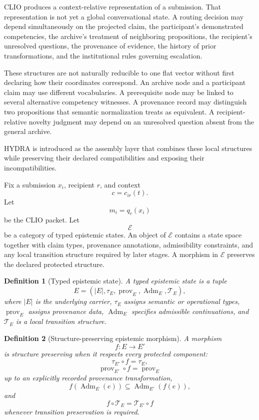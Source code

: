 \documentclass[11pt]{article}
\newtheorem{definition}{Definition}[section]
\theoremstyle{definition}
\DeclareMathOperator{\Adm}{Adm}
\begin{document}
CLIO produces a context-relative representation of a submission. That representation is not yet a global conversational state. A routing decision may depend simultaneously on the projected claim, the participant's demonstrated competencies, the archive's treatment of neighboring propositions, the recipient's unresolved questions, the provenance of evidence, the history of prior transformations, and the institutional rules governing escalation.

These structures are not naturally reducible to one flat vector without first declaring how their coordinates correspond. An archive node and a participant claim may use different vocabularies. A prerequisite node may be linked to several alternative competency witnesses. A provenance record may distinguish two propositions that semantic normalization treats as equivalent. A recipient-relative novelty judgment may depend on an unresolved question absent from the general archive.

HYDRA is introduced as the assembly layer that combines these local structures while preserving their declared compatibilities and exposing their incompatibilities.

Fix a submission \(x_i\), recipient \(r\), and context
\[
c=c_{ir}(t).
\]
Let
\[
m_i=q_c(x_i)
\]
be the CLIO packet. Let
\[
\mathscr E
\]
be a category of typed epistemic states. An object of \(\mathscr E\) contains a state space together with claim types, provenance annotations, admissibility constraints, and any local transition structure required by later stages. A morphism in \(\mathscr E\) preserves the declared protected structure.

\begin{definition}[Typed epistemic state]
A typed epistemic state is a tuple
\[
E
=
\left(
|E|,
\tau_E,
\operatorname{prov}_E,
\Adm_E,
\mathcal T_E
\right),
\]
where \(|E|\) is the underlying carrier, \(\tau_E\) assigns semantic or operational types, \(\operatorname{prov}_E\) assigns provenance data, \(\Adm_E\) specifies admissible continuations, and \(\mathcal T_E\) is a local transition structure.
\end{definition}

\begin{definition}[Structure-preserving epistemic morphism]
A morphism
\[
f:E\to E'
\]
is structure preserving when it respects every protected component:
\[
\tau_{E'}\circ f
=
\tau_E,
\]
\[
\operatorname{prov}_{E'}\circ f
=
\operatorname{prov}_E
\]
up to an explicitly recorded provenance transformation,
\[
f(\Adm_E(e))
\subseteq
\Adm_{E'}(f(e)),
\]
and
\[
f\circ\mathcal T_E
=
\mathcal T_{E'}\circ f
\]
whenever transition preservation is required.
\end{definition}
\end{document}
